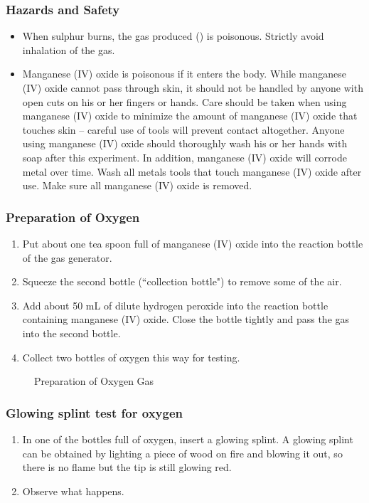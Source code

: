 \subsubsection*{Hazards and Safety}
\begin{itemize}
\item{When sulphur burns, the gas produced () is poisonous. Strictly avoid inhalation of the gas.}
\item{Manganese (IV) oxide is poisonous if it enters the body. While manganese (IV) oxide cannot pass through skin, it should not be handled by anyone with open cuts on his or her fingers or hands. Care should be taken when using manganese (IV) oxide to minimize the amount of manganese (IV) oxide that touches skin – careful use of tools will prevent contact altogether. Anyone using manganese (IV) oxide should thoroughly wash his or her hands with soap after this experiment. In addition, manganese (IV) oxide will corrode metal over time. Wash all metals tools that touch manganese (IV) oxide after use. Make sure all manganese (IV) oxide is removed.}
\end{itemize}

\subsubsection*{Preparation of Oxygen}
\begin{enumerate}
\item{Put about one tea spoon full of manganese (IV) oxide into the reaction bottle of the gas generator.}
\item{Squeeze the second bottle (``collection bottle") to remove some of the air.}
\item{Add about 50 mL of dilute hydrogen peroxide into the reaction bottle containing manganese (IV) oxide. Close the bottle tightly and pass the gas into the second bottle.}
\item{Collect two bottles of oxygen this way for testing.}
\end{enumerate}
\begin{figure}[h]
\begin{center}
\def\svgwidth{250pt}

\caption{Preparation of Oxygen Gas}
\label{fig:oxygen-prep}
\end{center}
\end{figure}

\subsubsection*{Glowing splint test for oxygen}
\begin{enumerate}
\item{In one of the bottles full of oxygen, insert a glowing splint. A glowing splint can be obtained by lighting a piece of wood on fire and blowing it out, so there is no flame but the tip is still glowing red.}
\item{Observe what happens.}
\end{enumerate}

